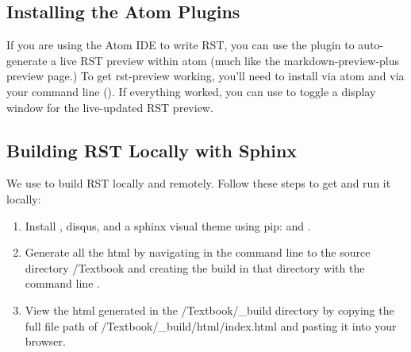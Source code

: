 \documentclass[letterpaper,10pt,english]{sphinxmanual}
\begin{document}
\subsection{Installing the Atom Plugins}
\label{\detokenize{Textbook_Creation_Help/rst_intro:installing-the-atom-plugins}}\label{\detokenize{Textbook_Creation_Help/rst_intro:heading-installing-atom}}
If you are using the Atom IDE to write RST, you can use the  plugin to auto-generate a live RST preview within atom (much like the markdown-preview-plus preview page.) To get rst-preview working, you’ll need to install  via atom and  via your command line (). If everything worked, you can use  to toggle a display window for the live-updated RST preview.


\subsection{Building RST Locally with Sphinx}
\label{\detokenize{Textbook_Creation_Help/rst_intro:building-rst-locally-with-sphinx}}\label{\detokenize{Textbook_Creation_Help/rst_intro:heading-building-rst-locally}}
We use  to build RST locally and remotely. Follow these steps to get  and run it locally:
\begin{enumerate}
\item {} 
Install , disqus, and a sphinx visual theme using pip:  and .

\item {} 
Generate all the html by navigating in the command line to the source directory /Textbook and creating the build in that directory with the command line .

\item {} 
View the html generated in the /Textbook/\_build directory by copying the full file path of /Textbook/\_build/html/index.html and pasting it into your browser.

\end{enumerate}
\end{document}
